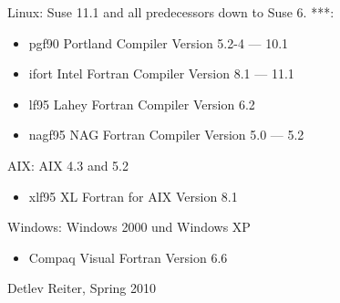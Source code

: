 Linux: Suse 11.1 and all predecessors down to Suse 6.
***:
\begin{itemize}
  \item pgf90 Portland Compiler Version 5.2-4  --- 10.1
  \item ifort Intel Fortran Compiler
        Version 8.1 --- 11.1
  \item lf95 Lahey Fortran Compiler Version 6.2
  \item nagf95	NAG Fortran Compiler Version 5.0 --- 5.2
\end{itemize}
AIX: AIX 4.3 and 5.2
\begin{itemize}
  \item xlf95	XL Fortran for AIX Version 8.1
\end{itemize}
Windows: Windows 2000 und Windows XP
\begin{itemize}
  \item Compaq Visual Fortran Version 6.6
\end{itemize}

Detlev Reiter, Spring	      2010
